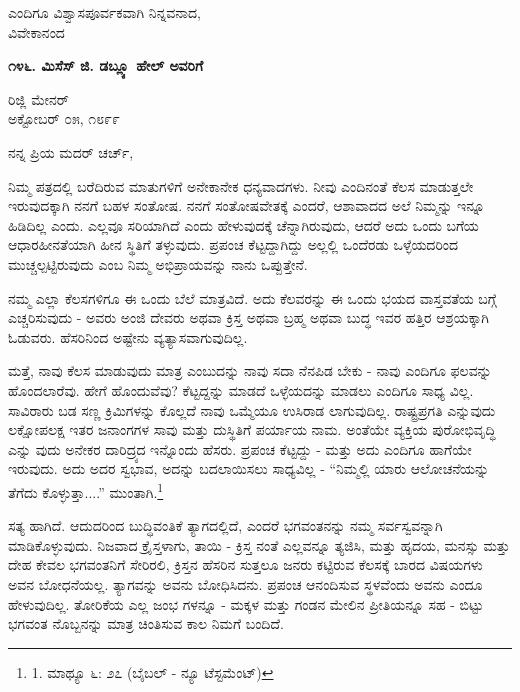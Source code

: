 \begin{flushright}
ಎಂದಿಗೂ ವಿಶ್ವಾಸಪೂರ್ವಕವಾಗಿ ನಿನ್ನವನಾದ,\\ವಿವೇಕಾನಂದ
\end{flushright}

\begin{center}
\textbf{೧೪೬. ಮಿಸೆಸ್ ಜಿ. ಡಬ್ಲ್ಯೂ ಹೇಲ್ ಅವರಿಗೆ}
\end{center}

\begin{flushright}
ರಿಜ್ಲಿ ಮೇನರ್\\ಅಕ್ಟೋಬರ್ ೦೫, ೧೮೯೯
\end{flushright}

ನನ್ನ ಪ್ರಿಯ ಮದರ್ ಚರ್ಚ್,

ನಿಮ್ಮ ಪತ್ರದಲ್ಲಿ ಬರೆದಿರುವ ಮಾತುಗಳಿಗೆ ಅನೇಕಾನೇಕ ಧನ್ಯವಾದಗಳು. ನೀವು ಎಂದಿನಂತೆ ಕೆಲಸ ಮಾಡುತ್ತಲೇ ಇರುವುದಕ್ಕಾಗಿ ನನಗೆ ಬಹಳ ಸಂತೋಷ. ನನಗೆ ಸಂತೋಷವೇತಕ್ಕೆ ಎಂದರೆ, ಆಶಾವಾದದ ಅಲೆ ನಿಮ್ಮನ್ನು ಇನ್ನೂ ಹಿಡಿದಿಲ್ಲ ಎಂದು. ಎಲ್ಲವೂ ಸರಿಯಾಗಿದೆ ಎಂದು ಹೇಳುವುದಕ್ಕೆ ಚೆನ್ನಾಗಿರುವುದು, ಆದರೆ ಅದು ಒಂದು ಬಗೆಯ ಆಧಾರಹೀನತೆಯಾಗಿ ಹೀನ ಸ್ಥಿತಿಗೆ ತಳ್ಳುವುದು. ಪ್ರಪಂಚ ಕೆಟ್ಟದ್ದಾಗಿದ್ದು ಅಲ್ಲಲ್ಲಿ ಒಂದೆರಡು ಒಳ್ಳೆಯದರಿಂದ ಮುಚ್ಚಲ್ಪಟ್ಟಿರುವುದು ಎಂಬ ನಿಮ್ಮ ಅಭಿಪ್ರಾಯವನ್ನು ನಾನು ಒಪ್ಪುತ್ತೇನೆ.

ನಮ್ಮ ಎಲ್ಲಾ ಕೆಲಸಗಳಿಗೂ ಈ ಒಂದು ಬೆಲೆ ಮಾತ್ರವಿದೆ. ಅದು ಕೆಲವರನ್ನು ಈ ಒಂದು ಭಯದ ವಾಸ್ತವತೆಯ ಬಗ್ಗೆ ಎಚ್ಚರಿಸುವುದು - ಅವರು ಅಂಜಿ ದೇವರು ಅಥವಾ ಕ್ರಿಸ್ತ ಅಥವಾ ಬ್ರಹ್ಮ ಅಥವಾ ಬುದ್ಧ ಇವರ ಹತ್ತಿರ ಆಶ್ರಯಕ್ಕಾಗಿ ಓಡುವರು. ಹೆಸರಿನಿಂದ ಅಷ್ಟೇನು ವ್ಯತ್ಯಾಸವಾಗುವುದಿಲ್ಲ.

ಮತ್ತೆ, ನಾವು ಕೆಲಸ ಮಾಡುವುದು ಮಾತ್ರ ಎಂಬುದನ್ನು ನಾವು ಸದಾ ನೆನಪಿಡ ಬೇಕು - ನಾವು ಎಂದಿಗೂ ಫಲವನ್ನು ಹೊಂದಲಾರೆವು. ಹೇಗೆ ಹೊಂದುವೆವು? ಕೆಟ್ಟದ್ದನ್ನು ಮಾಡದೆ ಒಳ್ಳೆಯದನ್ನು ಮಾಡಲು ಎಂದಿಗೂ ಸಾಧ್ಯ ವಿಲ್ಲ. ಸಾವಿರಾರು ಬಡ ಸಣ್ಣ ಕ್ರಿಮಿಗಳನ್ನು ಕೊಲ್ಲದೆ ನಾವು ಒಮ್ಮೆಯೂ ಉಸಿರಾಡ ಲಾಗುವುದಿಲ್ಲ. ರಾಷ್ಟ್ರಪ್ರಗತಿ ಎನ್ನುವುದು ಲಕ್ಷೋಪಲಕ್ಷ ಇತರ ಜನಾಂಗಗಳ ಸಾವು ಮತ್ತು ದುಸ್ಥಿತಿಗೆ ಪರ್ಯಾಯ ನಾಮ. ಅಂತೆಯೇ ವ್ಯಕ್ತಿಯ ಪುರೋಭಿವೃದ್ಧಿ ಎನ್ನು ವುದು ಅನೇಕರ ದಾರಿದ್ರ್ಯದ ಇನ್ನೊಂದು ಹೆಸರು. ಪ್ರಪಂಚ ಕೆಟ್ಟದ್ದು - ಮತ್ತು ಅದು ಎಂದಿಗೂ ಹಾಗೆಯೇ ಇರುವುದು. ಅದು ಅದರ ಸ್ವಭಾವ, ಅದನ್ನು ಬದಲಾಯಿಸಲು ಸಾಧ್ಯವಿಲ್ಲ - “ನಿಮ್ಮಲ್ಲಿ ಯಾರು ಆಲೋಚನೆಯನ್ನು ತೆಗೆದು ಕೊಳ್ಳುತ್ತಾ....” ಮುಂತಾಗಿ.\footnote{1. ಮಾಥ್ಯೂ ೬: ೨೭ (ಬೈಬಲ್ - ನ್ಯೂ ಟೆಸ್ಟಮೆಂಟ್)}

ಸತ್ಯ ಹಾಗಿದೆ. ಆದುದರಿಂದ ಬುದ್ಧಿವಂತಿಕೆ ತ್ಯಾಗದಲ್ಲಿದೆ, ಎಂದರೆ ಭಗವಂತನನ್ನು ನಮ್ಮ ಸರ್ವಸ್ವವನ್ನಾಗಿ ಮಾಡಿಕೊಳ್ಳುವುದು. ನಿಜವಾದ ಕ್ರೈಸ್ತಳಾಗು, ತಾಯಿ - ಕ್ರಿಸ್ತ ನಂತೆ ಎಲ್ಲವನ್ನೂ ತ್ಯಜಿಸಿ, ಮತ್ತು ಹೃದಯ, ಮನಸ್ಸು ಮತ್ತು ದೇಹ ಕೇವಲ ಭಗವಂತನಿಗೆ ಸೇರಿರಲಿ, ಕ್ರಿಸ್ತನ ಹೆಸರಿನ ಸುತ್ತಲೂ ಜನರು ಕಟ್ಟಿರುವ ಕೆಲಸಕ್ಕೆ ಬಾರದ ವಿಷಯಗಳು ಅವನ ಬೋಧನೆಯಲ್ಲ. ತ್ಯಾಗವನ್ನು ಅವನು ಬೋಧಿಸಿದನು. ಪ್ರಪಂಚ ಆನಂದಿಸುವ ಸ್ಥಳವೆಂದು ಅವನು ಎಂದೂ ಹೇಳುವುದಿಲ್ಲ. ತೋರಿಕೆಯ ಎಲ್ಲ ಜಂಭ ಗಳನ್ನೂ - ಮಕ್ಕಳ ಮತ್ತು ಗಂಡನ ಮೇಲಿನ ಪ್ರೀತಿಯನ್ನೂ ಸಹ - ಬಿಟ್ಟು ಭಗವಂತ ನೊಬ್ಬನನ್ನು ಮಾತ್ರ ಚಿಂತಿಸುವ ಕಾಲ ನಿಮಗೆ ಬಂದಿದೆ.

